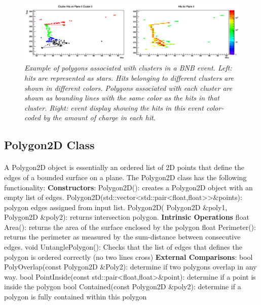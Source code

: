 \documentclass{article}
\begin{document}
\begin{figure}[h!]
\begin{center}
\includegraphics[width=150mm]{Figures/cluster_polygon_example.png}
\end{center}
\caption{\textit{Example of polygons associated with clusters in a BNB event. Left: hits are represented as stars. 
Hits belonging to different clusters are shown in different colors. Polygons associated with each cluster are shown as
bounding lines with the same color as the hits in that cluster. Right: event display showing the hits in this event
color-coded by the amount of charge in each hit.}}
\label{fig:cluster_polygon_example}
\end{figure}

\subsection{Polygon2D Class}
\paragraph{} A Polygon2D object is essentially an ordered list of 2D points that define the edges of a bounded surface
on a plane. The Polygon2D class has the following functionality:\newline
\newline
\textbf{Constructors}:\newline
Polygon2D(): creates a Polygon2D object with an empty list of edges.\newline
Polygon2D(std::vector\textless std::pair\textless float,float\textgreater \textgreater \&points): polygon edges assigned from input list.\newline
Polygon2D( Polygon2D \&poly1, Polygon2D \&poly2): returns intersection polygon.\newline
\textbf{Intrinsic Operations}\newline
float Area(): returns the area of the surface enclosed by the polygon\newline
float Perimeter(): returns the perimeter as measured by the sum-distance between consecutive edges.\newline
void UntanglePolygon(): Checks that the list of edges that defines the polygon is ordered correctly (no two lines cross)\newline
\textbf{External Comparisons}:\newline
bool PolyOverlap(const Polygon2D \&Poly2): determine if two polygons overlap in any way.\newline
bool PointInside(const std::pair\textless float,float\textgreater \&point): determine if a point is inside the polygon\newline
bool Contained(const Polygon2D \&poly2): determine if a polygon is fully contained within this polygon\newline
\end{document}
